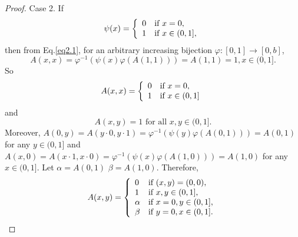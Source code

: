 \documentclass[12pt]{article}
\begin{document}
\begin{proof}
Case 2. If $$\psi(x)=\left\{\begin{array}{ll}
0 & {\mbox{\scriptsize\normalsize if } x=0,}\\
1 & {\mbox{\scriptsize\normalsize if } x \in(0, 1],}
\end{array}
\right.$$
then from Eq.\eqref{eq2.1}, for an arbitrary increasing bijection $\varphi:[0, 1] \rightarrow[0, b]$,
$$A(x, x) =\varphi^{-1}(\psi(x)\varphi(A(1, 1)))=A(1, 1)=1, x \in(0, 1].$$
So
\begin{equation*}
A(x,x)=\left\{\begin{array}{ll}
0 & {\mbox{\scriptsize\normalsize if  } x=0},\\
1 & {\mbox{\scriptsize\normalsize if  } x\in(0, 1]}
\end{array}
\right.
\end{equation*}
and
$$A(x,y)=1 \mbox{ for all } x,y \in(0, 1].$$
Moreover, $A(0,y)=A(y\cdot0,y\cdot1)=\varphi^{-1}(\psi(y)\varphi(A(0, 1)))=A(0, 1)$ for any $y\in(0, 1]$ and $A(x,0)=A(x\cdot1,x\cdot0)=\varphi^{-1}(\psi(x)\varphi(A(1, 0)))=A(1, 0)$ for any $x\in(0, 1]$. Let $\alpha=A(0, 1)$ $\beta=A(1, 0)$. Therefore,
\begin{equation*}
A(x,y)=\left\{\begin{array}{ll}
0 & {\mbox{\scriptsize\normalsize if  } (x,y)=(0,0)},\\
1 & {\mbox{\scriptsize\normalsize if  } x,y \in(0, 1]},\\
\alpha & {\mbox{\scriptsize\normalsize if  } x=0, y\in(0, 1]},\\
\beta & {\mbox{\scriptsize\normalsize if  } y=0, x\in(0, 1]}.
\end{array}
\right.
\end{equation*}


\end{proof}
\end{document}
